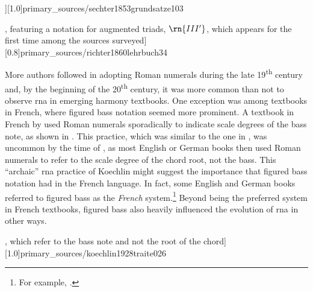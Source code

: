 \phdfigure[Use of Roman numerals, underneath chord label
 annotations, in \textcite[p.
 103]{sechter1853grundsatze}][1.0]{primary_sources/sechter1853grundsatze103}

\phdfigure[Adoption of the Weber syntax in \textcite[p.
34]{richter1860lehrbuch}, featuring a notation for augmented
triads, $\rn{III'}$, which appears for the first time among
the sources
surveyed][0.8]{primary_sources/richter1860lehrbuch34}

More authors followed in adopting Roman numerals during the
late 19\textsuperscript{th} century and, by the beginning of
the 20\textsuperscript{th} century, it was more common than
not to observe \gls{rna} in emerging harmony textbooks. One
exception was among textbooks in French, where figured bass
notation seemed more prominent. A textbook in French by
\textcite{koechlin1928traite} used Roman numerals
sporadically to indicate scale degrees of the bass note, as
shown in .
This practice, which was similar to the one in
\textcite{hamilton1840catechism}, was uncommon by the time
of \textcite{koechlin1928traite}, as most English or German
books then used Roman numerals to refer to the scale degree
of the chord root, not the bass. This ``archaic'' \gls{rna}
practice of Koechlin might suggest the importance that
figured bass notation had in the French language. In fact,
some English and German books referred to figured bass as
the \emph{French} system.\footnote{For example,
\textcite{norris1894practical}.} Beyond being the preferred
system in French textbooks, figured bass also heavily
influenced the evolution of \gls{rna} in other ways.

\phdfigure[The scale-degrees of \textcite[p.
26]{koechlin1928traite}, which refer to the bass note and
not the root of the
chord][1.0]{primary_sources/koechlin1928traite026}
